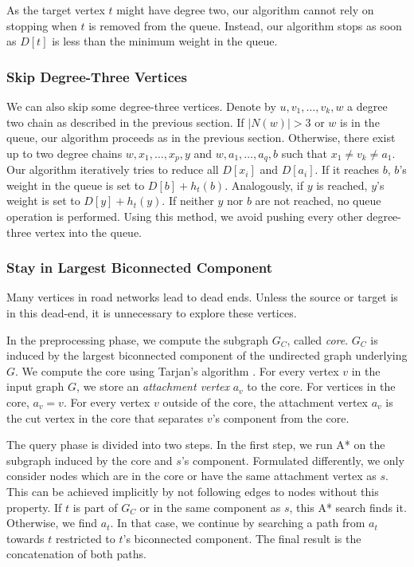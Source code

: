 \documentclass[manuscript,review]{acmart}
\begin{document}
As the target vertex $t$ might have degree two, our algorithm cannot rely on stopping when $t$ is removed from the queue.
Instead, our algorithm stops as soon as $D[t]$ is less than the minimum weight in the queue.

\subsubsection{Skip Degree-Three Vertices}

We can also skip some degree-three vertices.
Denote by $u, v_1,\ldots, v_k, w$ a degree two chain as described in the previous section.
If $|N(w)| > 3$ or $w$ is in the queue, our algorithm proceeds as in the previous section.
Otherwise, there exist up to two degree chains $w, x_1,\ldots,x_p, y$ and $w,a_1,\ldots,a_q,b$ such that $x_1\neq v_k \neq a_1$.
Our algorithm iteratively tries to reduce all $D[x_i]$ and $D[a_i]$.
If it reaches $b$, $b$'s weight in the queue is set to $D[b]+h_t(b)$.
Analogously, if $y$ is reached, $y$'s weight is set to $D[y]+h_t(y)$.
If neither $y$ nor $b$ are not reached, no queue operation is performed.
Using this method, we avoid pushing every other degree-three vertex into the queue.

\subsubsection{Stay in Largest Biconnected Component}\label{sec:largested-biconnected-component}

Many vertices in road networks lead to dead ends.
Unless the source or target is in this dead-end, it is unnecessary to explore these vertices.

In the preprocessing phase, we compute the subgraph $G_C$, called \emph{core}.
$G_C$ is induced by the largest biconnected component of the undirected graph underlying $G$.
We compute the core using Tarjan's algorithm \cite{t-dfslg2-72}.
For every vertex $v$ in the input graph $G$, we store an \emph{attachment vertex} $a_v$ to the core.
For vertices in the core, $a_v=v$.
For every vertex $v$ outside of the core, the attachment vertex $a_v$ is the cut vertex in the core that separates $v$'s component from the core.

The query phase is divided into two steps.
In the first step, we run A* on the subgraph induced by the core and $s$'s component.
Formulated differently, we only consider nodes which are in the core or have the same attachment vertex as $s$.
This can be achieved implicitly by not following edges to nodes without this property.
If $t$ is part of $G_C$ or in the same component as $s$, this A* search finds it.
Otherwise, we find $a_t$.
In that case, we continue by searching a path from $a_t$ towards $t$ restricted to $t$'s biconnected component.
The final result is the concatenation of both paths.
\end{document}
